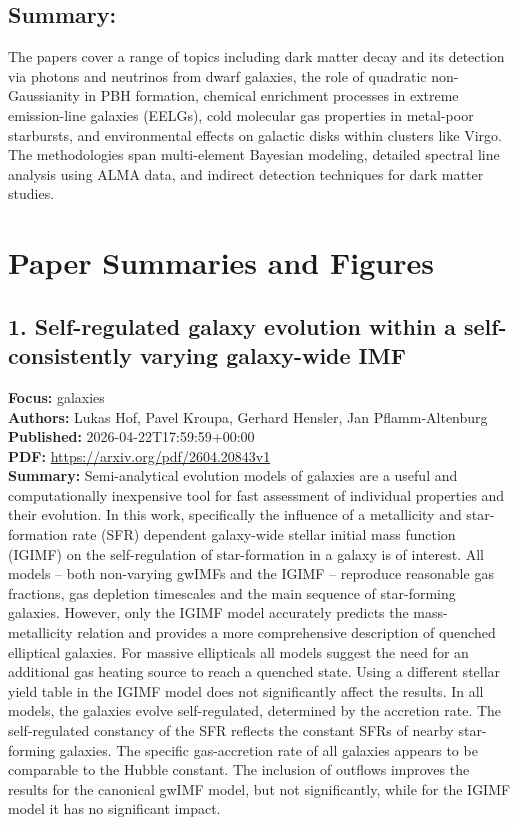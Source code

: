 \documentclass[11pt]{article}
\begin{document}
\subsection*{Summary:}
The papers cover a range of topics including dark matter decay and its detection via photons and neutrinos from dwarf galaxies, the role of quadratic non-Gaussianity in PBH formation, chemical enrichment processes in extreme emission-line galaxies (EELGs), cold molecular gas properties in metal-poor starbursts, and environmental effects on galactic disks within clusters like Virgo. The methodologies span multi-element Bayesian modeling, detailed spectral line analysis using ALMA data, and indirect detection techniques for dark matter studies.
\newpage
\section*{Paper Summaries and Figures}
\subsection*{1. Self-regulated galaxy evolution within a self-consistently varying galaxy-wide IMF}
\textbf{Focus:} galaxies\\
\textbf{Authors:} Lukas Hof, Pavel Kroupa, Gerhard Hensler, Jan Pflamm-Altenburg\\
\textbf{Published:} 2026-04-22T17:59:59+00:00\\
\textbf{PDF:} \href{https://arxiv.org/pdf/2604.20843v1}{https://arxiv.org/pdf/2604.20843v1}\\
\textbf{Summary:}
Semi-analytical evolution models of galaxies are a useful and computationally inexpensive tool for fast assessment of individual properties and their evolution. In this work, specifically the influence of a metallicity and star-formation rate (SFR) dependent galaxy-wide stellar initial mass function (IGIMF) on the self-regulation of star-formation in a galaxy is of interest. All models -- both non-varying gwIMFs and the IGIMF -- reproduce reasonable gas fractions, gas depletion timescales and the main sequence of star-forming galaxies. However, only the IGIMF model accurately predicts the mass-metallicity relation and provides a more comprehensive description of quenched elliptical galaxies. For massive ellipticals all models suggest the need for an additional gas heating source to reach a quenched state. Using a different stellar yield table in the IGIMF model does not significantly affect the results. In all models, the galaxies evolve self-regulated, determined by the accretion rate. The self-regulated constancy of the SFR reflects the constant SFRs of nearby star-forming galaxies. The specific gas-accretion rate of all galaxies appears to be comparable to the Hubble constant. The inclusion of outflows improves the results for the canonical gwIMF model, but not significantly, while for the IGIMF model it has no significant impact.
\newpage
\end{document}
